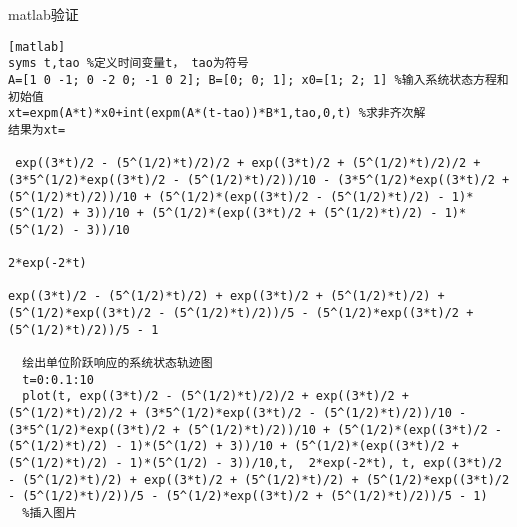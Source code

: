 \documentclass[a4paper]{article}
\begin{document}
matlab验证
\begin{verbatim}[matlab]
syms t,tao %定义时间变量t， tao为符号
A=[1 0 -1; 0 -2 0; -1 0 2]; B=[0; 0; 1]; x0=[1; 2; 1] %输入系统状态方程和初始值
xt=expm(A*t)*x0+int(expm(A*(t-tao))*B*1,tao,0,t) %求非齐次解
结果为xt=
 
 exp((3*t)/2 - (5^(1/2)*t)/2)/2 + exp((3*t)/2 + (5^(1/2)*t)/2)/2 + (3*5^(1/2)*exp((3*t)/2 - (5^(1/2)*t)/2))/10 - (3*5^(1/2)*exp((3*t)/2 + (5^(1/2)*t)/2))/10 + (5^(1/2)*(exp((3*t)/2 - (5^(1/2)*t)/2) - 1)*(5^(1/2) + 3))/10 + (5^(1/2)*(exp((3*t)/2 + (5^(1/2)*t)/2) - 1)*(5^(1/2) - 3))/10
                                                                                                                                                                                                                                                                                 2*exp(-2*t)
                                                                                                                                       exp((3*t)/2 - (5^(1/2)*t)/2) + exp((3*t)/2 + (5^(1/2)*t)/2) + (5^(1/2)*exp((3*t)/2 - (5^(1/2)*t)/2))/5 - (5^(1/2)*exp((3*t)/2 + (5^(1/2)*t)/2))/5 - 1
  
  绘出单位阶跃响应的系统状态轨迹图
  t=0:0.1:10
  plot(t, exp((3*t)/2 - (5^(1/2)*t)/2)/2 + exp((3*t)/2 + (5^(1/2)*t)/2)/2 + (3*5^(1/2)*exp((3*t)/2 - (5^(1/2)*t)/2))/10 - (3*5^(1/2)*exp((3*t)/2 + (5^(1/2)*t)/2))/10 + (5^(1/2)*(exp((3*t)/2 - (5^(1/2)*t)/2) - 1)*(5^(1/2) + 3))/10 + (5^(1/2)*(exp((3*t)/2 + (5^(1/2)*t)/2) - 1)*(5^(1/2) - 3))/10,t,  2*exp(-2*t), t, exp((3*t)/2 - (5^(1/2)*t)/2) + exp((3*t)/2 + (5^(1/2)*t)/2) + (5^(1/2)*exp((3*t)/2 - (5^(1/2)*t)/2))/5 - (5^(1/2)*exp((3*t)/2 + (5^(1/2)*t)/2))/5 - 1)
  %插入图片
\end{verbatim}
\end{document}

